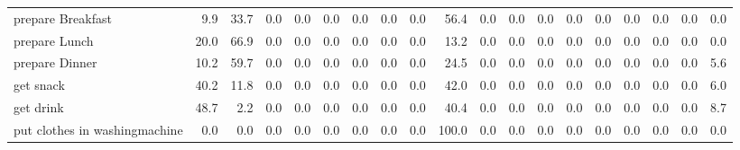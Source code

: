 \documentclass{article}
\begin{document}
\begin{sideways}
\begin{tabular}{lrrrrrrrrrrrrrrrrrr}
prepare Breakfast             &         9.9 &               33.7 &           0.0 &                          0.0 &                0.0 &                0.0 &                        0.0 &          0.0 &             56.4 &                0.0 &                    0.0 &                      0.0 &                  0.0 &                   0.0 &              0.0 &              0.0 &                                  0.0 &          0.0 \\
prepare Lunch                 &        20.0 &               66.9 &           0.0 &                          0.0 &                0.0 &                0.0 &                        0.0 &          0.0 &             13.2 &                0.0 &                    0.0 &                      0.0 &                  0.0 &                   0.0 &              0.0 &              0.0 &                                  0.0 &          0.0 \\
prepare Dinner                &        10.2 &               59.7 &           0.0 &                          0.0 &                0.0 &                0.0 &                        0.0 &          0.0 &             24.5 &                0.0 &                    0.0 &                      0.0 &                  0.0 &                   0.0 &              0.0 &              0.0 &                                  0.0 &          5.6 \\
get snack                     &        40.2 &               11.8 &           0.0 &                          0.0 &                0.0 &                0.0 &                        0.0 &          0.0 &             42.0 &                0.0 &                    0.0 &                      0.0 &                  0.0 &                   0.0 &              0.0 &              0.0 &                                  0.0 &          6.0 \\
get drink                     &        48.7 &                2.2 &           0.0 &                          0.0 &                0.0 &                0.0 &                        0.0 &          0.0 &             40.4 &                0.0 &                    0.0 &                      0.0 &                  0.0 &                   0.0 &              0.0 &              0.0 &                                  0.0 &          8.7 \\
put clothes in washingmachine &         0.0 &                0.0 &           0.0 &                          0.0 &                0.0 &                0.0 &                        0.0 &          0.0 &            100.0 &                0.0 &                    0.0 &                      0.0 &                  0.0 &                   0.0 &              0.0 &              0.0 &                                  0.0 &          0.0 \\

\end{tabular}
\end{sideways}
\end{document}
